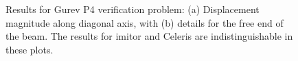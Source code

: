 \begin{figure}[ht!]
{\label{fig:gurev4-2}}		
%
\caption{Results for Gurev P4 verification problem: (a) Displacement magnitude along diagonal axis, with (b) details for the free end of the beam. The results for imitor and Celeris are indistinguishable in these plots.}
\label{fig:gurev4}
\end{figure}

\begin{figure}[ht!]
\centering
{}		
\subfigure[]{%
}
\end{figure}
